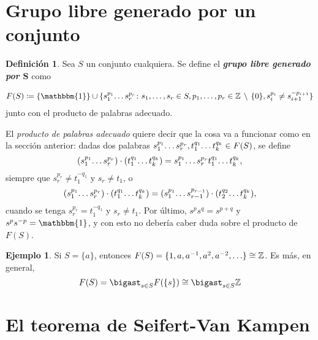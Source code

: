 \documentclass[11pt]{report}
\newenvironment{cdefinition} %
  {\begin{mdframed}[innertopmargin = 0pt,
                    innerbottommargin = 7.5pt,
                    backgroundcolor = lightgray!10,
                    linewidth = 1pt,
                    shadow = true,
                    shadowsize = 5pt,
                    roundcorner = 0pt,
                    skipabove = 0pt]
    \begin{definition}}
  {\end{definition}\end{mdframed}}
\theoremstyle{definition}
\newtheorem{definition}{Definición}[chapter]
\theoremstyle{definition}
\newtheorem{example}{Ejemplo}[chapter]
\theoremstyle{remark}
\newcommand{\Z}{\mathbb Z}
\begin{document}
\section{Grupo libre generado por un conjunto}

\begin{cdefinition}
Sea $S$ un conjunto cualquiera. Se define el \textbf{\textit{grupo libre generado por $\bm{S}$}} como

\vspace{-3mm}

\[F(S) \coloneqq \{\mathbbm{1}\} \cup \{s_1^{p_1} \! \mathellipsis s_r^{p_r} \colon s_1,\mathellipsis,s_r \in S, p_1,\mathellipsis,p_r \in \Z \, \setminus \, \{0\}, s_i^{p_i} \neq s_{i+1}^{-p_{i+1}}\}\]
junto con el producto de palabras adecuado.
\end{cdefinition}

El \textit{producto de palabras adecuado} quiere decir que la cosa va a funcionar como en la sección anterior: dadas dos palabras $s_1^{p_1} \! \mathellipsis s_r^{p_r}, t_1^{q_1} \! \mathellipsis t_k^{q_k} \in F(S)$, se define
\[(s_1^{p_1} \! \mathellipsis s_r^{p_r}) \cdot (t_1^{q_1} \! \mathellipsis t_k^{q_k}) = s_1^{p_1} \! \mathellipsis s_r^{p_r} t_1^{q_1} \! \mathellipsis t_k^{q_k},\]
siempre que $s_r^{p_r} \neq t_1^{-q_1}$ y $s_r \neq t_1$, o
\[(s_1^{p_1} \! \mathellipsis s_r^{p_r}) \cdot (t_1^{q_1} \! \mathellipsis t_k^{q_k}) = (s_1^{p_1} \! \mathellipsis s_{r-1}^{p_{r-1}}) \cdot (t_2^{q_2} \! \mathellipsis t_k^{q_k}),\]
cuando se tenga $s_r^{p_r} = t_1^{-q_1}$ y $s_r \neq t_1$. Por último, $s^ps^q = s^{p+q}$ y $s^ps^{-p} = \mathbbm{1}$, y con esto no debería caber duda sobre el producto de $F(S)$.

\begin{example}
Si $S = \{a\}$, entonces $F(S) = \{1,a,a^{-1},a^2,a^{-2},\mathellipsis\} \cong \Z$. Es más, en general,
\[F(S) = \bigast_{s \in S} F(\{s\}) \cong \bigast_{s \in S} \Z\]
\end{example}

\section{El teorema de Seifert-Van Kampen}
\end{document}
